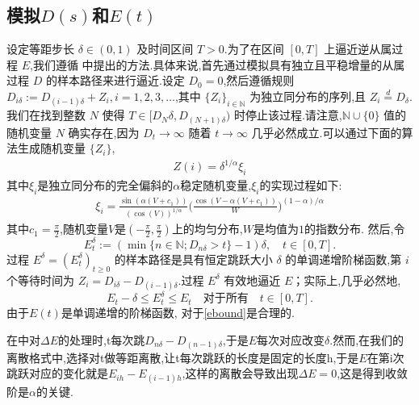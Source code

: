\subsection{模拟$D(s)$和$E(t)$}
设定等距步长 $\delta \in (0,1)$ 及时间区间 $T > 0$.为了在区间 $[0,T]$ 上逼近逆从属过程 $E$,我们遵循 \cite{magdziarz2009stochastic} 中提出的方法.具体来说,首先通过模拟具有独立且平稳增量的从属过程 $D$ 的样本路径来进行逼近.设定 $D_0 = 0$,然后遵循规则 $D_{i\delta} := D_{(i-1)\delta} + Z_i, i=1,2,3,\ldots$,其中 $\{Z_i\}_{i \in \mathbb{N}}$ 为独立同分布的序列,且 $Z_i \stackrel{d}{=} D_{\delta}$.我们在找到整数 $N$ 使得 $T \in [D_N\delta, D_{(N+1)\delta})$ 时停止该过程.请注意,$\mathbb{N}\cup\{0\}$ 值的随机变量 $N$ 确实存在,因为 $D_t \to \infty$ 随着 $t \to \infty$ 几乎必然成立.可以通过下面的算法生成随机变量 $\{Z_i\}$,
\begin{align*}
	Z(i)=\delta^{1/\alpha}\xi_{i}
\end{align*}
其中$\xi_i$是独立同分布的完全偏斜的$\alpha$稳定随机变量,$\xi_i$的实现过程如下:
\begin{align*}
	\xi_i=\frac{\sin(\alpha(V+c_1))}{\left(\cos(V)\right)^{1/\alpha}}\Big(\frac{\cos(V-\alpha(V+c_1))}{W}\Big)^{(1-\alpha)/\alpha}
\end{align*}
其中$c_1 = \frac{\pi}{2}$,随机变量$V$是$(-\frac{\pi}{2},\frac{\pi}{2})$上的均匀分布,$W$是均值为$1$的指数分布.
然后,令
$$
E_t^\delta := \left(\min\{n \in \mathbb{N}; D_{n\delta} > t\} - 1\right)\delta, \quad t \in [0, T].
$$
过程 $E^\delta = (E_t^\delta)_{t \geq 0}$ 的样本路径是具有恒定跳跃大小 $\delta$ 的单调递增阶梯函数,第 $i$ 个等待时间为 $Z_i = D_{i\delta} - D_{(i-1)\delta}$.过程 $E^\delta$ 有效地逼近 $E$；实际上,几乎必然地,
$$
E_t - \delta \leq E_t^\delta \leq E_t \quad \text{对于所有} \quad t \in [0, T].
$$
由于$E(t)$是单调递增的阶梯函数, 对于\cref{ebound}是合理的.


在\cite{jin2019strong}中对$\Delta E$的处理时,t每次跳$D_{n\delta} - D_{(n-1)\delta}$,于是$E$每次对应改变$\delta$.然而,在我们的离散格式中,选择对t做等距离散,让t每次跳跃的长度是固定的长度h,于是$E$在第i次跳跃对应的变化就是$E_{ih} - E_{(i-1)h}$,这样的离散会导致出现$\Delta E=0$,这是得到收敛阶是$\alpha$的关键.


